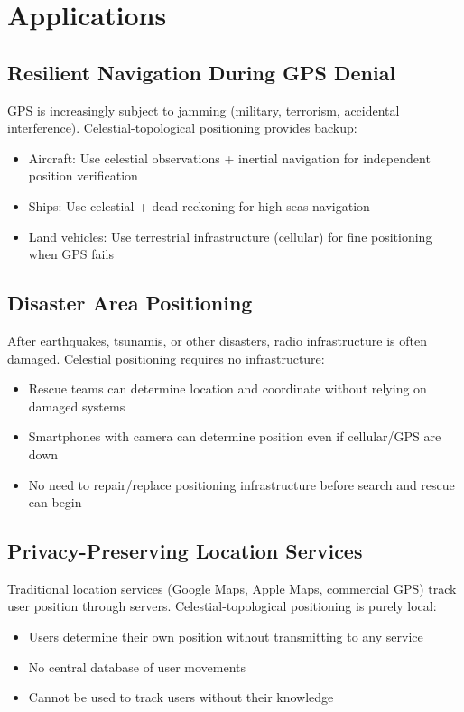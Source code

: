 \documentclass[11pt,twocolumn,a4paper]{article}
\theoremstyle{definition}
\begin{document}
\section{Applications}
\label{sec:applications}

\subsection{Resilient Navigation During GPS Denial}

GPS is increasingly subject to jamming (military, terrorism, accidental interference). Celestial-topological positioning provides backup:
\begin{itemize}[nosep]
\item Aircraft: Use celestial observations + inertial navigation for independent position verification
\item Ships: Use celestial + dead-reckoning for high-seas navigation
\item Land vehicles: Use terrestrial infrastructure (cellular) for fine positioning when GPS fails
\end{itemize}

\subsection{Disaster Area Positioning}

After earthquakes, tsunamis, or other disasters, radio infrastructure is often damaged. Celestial positioning requires no infrastructure:
\begin{itemize}[nosep]
\item Rescue teams can determine location and coordinate without relying on damaged systems
\item Smartphones with camera can determine position even if cellular/GPS are down
\item No need to repair/replace positioning infrastructure before search and rescue can begin
\end{itemize}

\subsection{Privacy-Preserving Location Services}

Traditional location services (Google Maps, Apple Maps, commercial GPS) track user position through servers. Celestial-topological positioning is purely local:
\begin{itemize}[nosep]
\item Users determine their own position without transmitting to any service
\item No central database of user movements
\item Cannot be used to track users without their knowledge
\end{itemize}
\end{document}
